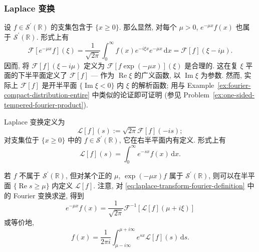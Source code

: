 \subsubsection{Laplace 变换}\label{subsec:laplace-transforms}

设 $f\in\mathcal{S}^{\prime}(\mathbb{R})$ 的支集包含于 $\{x\geq0\}$. 那么显然, 对每个 $\mu>0$, $e^{-\mu x}f(x)$ 也属于 $\mathcal{S}^{\prime}(\mathbb{R})$. 形式上有
\begin{equation}\label{eq:laplace-fourier-complex-frequency-shift}
\mathcal{F}[e^{-\mu x}f](\xi)=\dfrac1{\sqrt{2\pi}}\int_0^\infty f(x)e^{-i\xi x}e^{-\mu x}\,\mathrm{d}x=\mathcal{F}[f](\xi-i\mu).
\end{equation}
因而, 将 $\mathcal{F}[f](\xi-i\mu)$ 定义为 $\mathcal{F}[f\exp(-\mu x)](\xi)$ 是合理的. 这在复 $\xi$ 平面的下半平面定义了 $\mathcal{F}[f]$ --- 作为 $\operatorname{Re}\xi$ 的广义函数, 以 $\operatorname{Im}\xi$ 为参数. 然而, 实际上 $\mathcal{F}[f]$ 是开半平面 $\{\operatorname{Im}\xi<0\}$ 内 $\xi$ 的解析函数; 用与 Example~\ref{ex:fourier-compact-distribution-entire} 中类似的论证即可证明 (参见 Problem~\ref{ex:one-sided-tempered-fourier-product}).

Laplace 变换定义为
\begin{equation}\label{eq:laplace-transform-fourier-definition}
\mathcal{L}[f](s):=\sqrt{2\pi}\mathcal{F}[f](-is);
\end{equation}
对支集位于 $\{x\geq0\}$ 中的 $f\in\mathcal{S}^{\prime}(\mathbb{R})$, 它在右半平面内有定义. 形式上有
\begin{equation}\label{eq:laplace-transform-formal-integral}
\mathcal{L}[f](s)=\int_0^\infty e^{-sx}f(x)\,\mathrm{d}x.
\end{equation}


若 $f$ 不属于 $\mathcal{S}^{\prime}(\mathbb{R})$, 但对某个正的 $\mu$, $\exp(-\mu x)f$ 属于 $\mathcal{S}^{\prime}(\mathbb{R})$, 则可以在半平面 $\{\operatorname{Re}s\geq\mu\}$ 内定义 $\mathcal{L}[f]$. 注意, 对 \eqref{eq:laplace-transform-fourier-definition} 中的 Fourier 变换求逆, 得到
\begin{equation}\label{eq:laplace-inversion-weighted-fourier-formula}
e^{-\mu x}f(x)=\dfrac1{\sqrt{2\pi}}\mathcal{F}^{-1}[\mathcal{L}[f](\mu+i\xi)]
\end{equation}
或等价地,
\begin{equation}\label{eq:inverse-laplace-contour-formula}
f(x)=\dfrac1{2\pi i}\int_{\mu-i\infty}^{\mu+i\infty}e^{sx}\mathcal{L}[f](s)\,\mathrm{d}s.
\end{equation}


